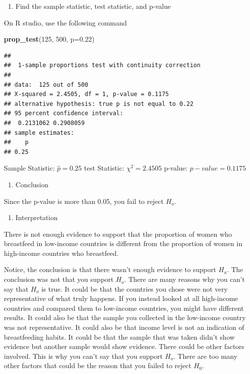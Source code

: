 \documentclass[
]{book}
\newenvironment{Shaded}{\begin{snugshade}}{\end{snugshade}}
\newcommand{\DataTypeTok}[1]{\textcolor[rgb]{0.13,0.29,0.53}{#1}}
\newcommand{\DecValTok}[1]{\textcolor[rgb]{0.00,0.00,0.81}{#1}}
\newcommand{\FloatTok}[1]{\textcolor[rgb]{0.00,0.00,0.81}{#1}}
\newcommand{\KeywordTok}[1]{\textcolor[rgb]{0.13,0.29,0.53}{\textbf{#1}}}
\newcommand{\NormalTok}[1]{#1}
\providecommand{\tightlist}{%
  \setlength{\itemsep}{0pt}\setlength{\parskip}{0pt}}
\begin{document}
\begin{enumerate}
\def\labelenumi{\arabic{enumi}.}
\setcounter{enumi}{3}
\tightlist
\item
  Find the sample statistic, test statistic, and p-value
\end{enumerate}

On R studio, use the following command

\begin{Shaded}
\begin{Highlighting}[]
\KeywordTok{prop_test}\NormalTok{(}\DecValTok{125}\NormalTok{, }\DecValTok{500}\NormalTok{, }\DataTypeTok{p=}\FloatTok{0.22}\NormalTok{)}
\end{Highlighting}
\end{Shaded}

\begin{verbatim}
## 
## 	1-sample proportions test with continuity correction
## 
## data:  125 out of 500
## X-squared = 2.4505, df = 1, p-value = 0.1175
## alternative hypothesis: true p is not equal to 0.22
## 95 percent confidence interval:
##  0.2131062 0.2908059
## sample estimates:
##    p 
## 0.25
\end{verbatim}

Sample Statistic: \(\hat{p}=0.25\)
test Statistic: \(\chi^2=2.4505\)
p-value: \(p-value=0.1175\)

\begin{enumerate}
\def\labelenumi{\arabic{enumi}.}
\setcounter{enumi}{4}
\tightlist
\item
  Conclusion
\end{enumerate}

Since the p-value is more than 0.05, you fail to reject \(H_o\).

\begin{enumerate}
\def\labelenumi{\arabic{enumi}.}
\setcounter{enumi}{5}
\tightlist
\item
  Interpretation
\end{enumerate}

There is not enough evidence to support that the proportion of women who breastfeed in low-income countries is different from the proportion of women in high-income countries who breastfeed.

Notice, the conclusion is that there wasn't enough evidence to support \(H_a\). The conclusion was not that you support \(H_o\). There are many reasons why you can't say that \(H_o\) is true. It could be that the countries you chose were not very representative of what truly happens. If you instead looked at all high-income countries and compared them to low-income countries, you might have different results. It could also be that the sample you collected in the low-income country was not representative. It could also be that income level is not an indication of breastfeeding habits. It could be that the sample that was taken didn't show evidence but another sample would show evidence. There could be other factors involved. This is why you can't say that you support \(H_o\). There are too many other factors that could be the reason that you failed to reject \(H_0\).
\end{document}

